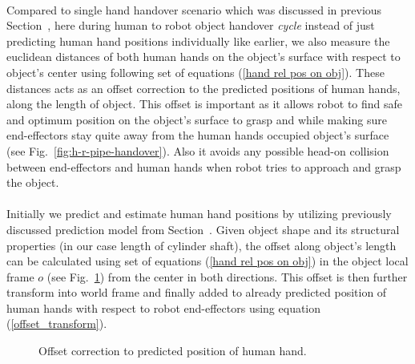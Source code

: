 \documentclass[a4paper, 12pt, oneside]{Thesis}  %
\begin{document}
\paragraph*{}
Compared to single hand handover scenario which was discussed in previous Section~, here during human to robot object handover \textit{cycle} instead of just predicting human hand positions individually like earlier, we also measure the euclidean distances of both human hands on the object's surface with respect to object's center using following set of equations (\ref{hand rel pos on obj}). These distances acts as an offset correction to the predicted positions of human hands, along the length of object. This offset is important as it allows robot to find safe and optimum position on the object's surface to grasp and while making sure end-effectors stay quite away from the human hands occupied object's surface (see Fig.~\ref{fig:h-r-pipe-handover}). Also it avoids any possible head-on collision between end-effectors and human hands when robot tries to approach and grasp the object.


\paragraph*{}
Initially we predict and estimate human hand positions by utilizing previously discussed prediction model from Section~. Given object shape and its structural properties (in our case length of cylinder shaft), the offset along object's length can be calculated using set of equations (\ref{hand rel pos on obj}) in the object local frame $o$ (see Fig.~\ref{fig:pipe-offset}) from the center in both directions. This offset is then further transform into world frame and finally added to already predicted position of human hands with respect to robot end-effectors using equation (\ref{offset_transform}).

\begin{figure}[hptb]
	\caption{Offset correction to predicted position of human hand.}
	\label{fig:pipe-offset}
\end{figure}
\end{document}
